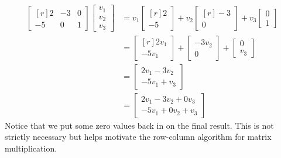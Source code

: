 \begin{example}
\begin{align*}
\begin{bmatrix*}[r]
2 & -3 & 0 \\
-5 & 0 & 1 
\end{bmatrix*}
\begin{bmatrix}v_1\\ v_2 \\ v_3 \end{bmatrix}
&=v_1\begin{bmatrix*}[r]2\\-5 \end{bmatrix*}
+v_2\begin{bmatrix*}[r]-3 \\0\end{bmatrix*}
+v_3\begin{bmatrix}0\\1\end{bmatrix}\\
&=\begin{bmatrix*}[r]2v_1\\-5v_1\end{bmatrix*}
+\begin{bmatrix}-3v_2\\ 0\end{bmatrix} 
+\begin{bmatrix}0\\v_3\end{bmatrix}\\
&=\begin{bmatrix}2v_1-3v_2\\-5v_1+v_3\end{bmatrix}\\
&=\begin{bmatrix}2v_1-3v_2+0v_3\\-5v_1+0v_2+v_3\end{bmatrix}
\end{align*}
Notice that we put some zero values back in on the final result. This is not 
strictly necessary but helps motivate the row-column algorithm for matrix 
multiplication.
\end{example}

